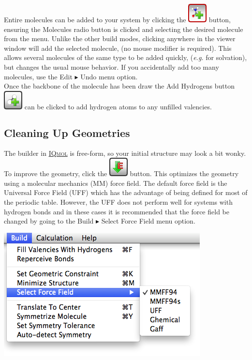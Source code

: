 \documentclass[a4paper,12pt]{article}
\newcommand{\iqmol}{\href{http://iqmol.org}{{\scshape IQmol}}}
\begin{document}
Entire molecules can be added to your system by clicking the
\includegraphics[scale=0.40]{figures/BuildFragButton.png} button, ensuring the
Molecules radio button is clicked and selecting the desired molecule from the
menu.  Unlike the other build modes, clicking anywhere in the viewer window
will add the selected molecule, (no mouse modifier is required).  This allows
several molecules of the same type to be added quickly, (\emph{e.g.} for
solvation), but changes the usual mouse behavior.  If you accidentally add 
too many molecules, use the Edit $\blacktriangleright$ Undo menu option. \\

Once the backbone of the molecule has been draw the Add Hydrogens button
\includegraphics[scale=0.40]{figures/AddHydrogensButton.png} can be clicked to add
hydrogen atoms to any unfilled valencies.



\subsection{Cleaning Up Geometries}

The builder in \iqmol{} is free-form, so your initial structure may look a bit
wonky.  To improve the geometry, click the
\includegraphics[scale=0.40]{figures/MinimizeEnergyButton.png} button.  This
optimizes the geometry using a molecular mechanics (MM) force field.   The default
force field is the Universal Force Field (UFF) which has the advantage of being
defined for most of the periodic table.  However, the UFF does not perform well
for systems with hydrogen bonds and in these cases it is recommended that the
force field be changed by going to the Build $\blacktriangleright$ Select Force Field menu
option.

\begin{center}
\includegraphics[scale=0.5]{figures/ForceFieldMenu.png}
\end{center}
\end{document}

